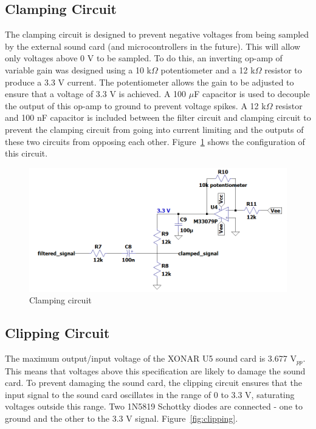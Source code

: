 \documentclass[class=report,11pt,crop=false]{standalone}
\begin{document}
\subsection{Clamping Circuit}
The clamping circuit is designed to prevent negative voltages from being sampled by the external sound card (and microcontrollers in the future). This will allow only voltages above 0 V to be sampled. To do this, an inverting op-amp of variable gain was designed using a 10 k$\Omega$ potentiometer and a 12 k$\Omega$ resistor to produce a 3.3 V current. The potentiometer allows the gain to be adjusted to ensure that a voltage of 3.3 V is achieved. A 100 $\mu$F capacitor is used to decouple the output of this op-amp to ground to prevent voltage spikes. A 12 k$\Omega$ resistor and 100 nF capacitor is included between the filter circuit and clamping circuit to prevent the clamping circuit from going into current limiting and the outputs of these two circuits from opposing each other. Figure~\ref{fig:clamping} shows the configuration of this circuit.

\begin{figure}[htbp]
    \centering
    \includegraphics[width=0.8\columnwidth]{../Images/clamping.png}
    \caption{Clamping circuit}
    \label{fig:clamping}
\end{figure}

\subsection{Clipping Circuit}
The maximum output/input voltage of the XONAR U5 sound card is 3.677 V$_{pp}$. This means that voltages above this specification are likely to damage the sound card. To prevent damaging the sound card, the clipping circuit ensures that the input signal to the sound card oscillates in the range of 0 to 3.3 V, saturating voltages outside this range. Two 1N5819 Schottky diodes are connected - one to ground and the other to the 3.3 V signal. Figure~\ref{fig:clipping}.
\end{document}
